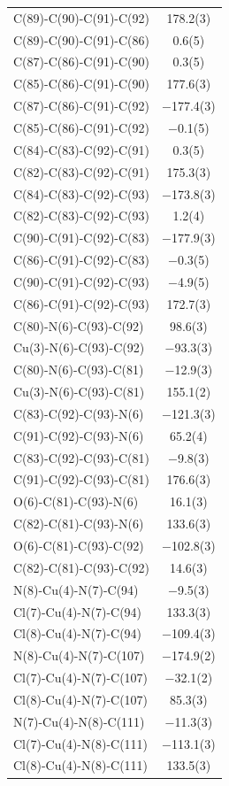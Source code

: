 \begin{center}
{\begin{supertabular}{p{1.8in}c}
C(89)-C(90)-C(91)-C(92)&178.2(3)\\
C(89)-C(90)-C(91)-C(86)&0.6(5)\\
C(87)-C(86)-C(91)-C(90)&0.3(5)\\
C(85)-C(86)-C(91)-C(90)&177.6(3)\\
C(87)-C(86)-C(91)-C(92)&$-$177.4(3)\\
C(85)-C(86)-C(91)-C(92)&$-$0.1(5)\\
C(84)-C(83)-C(92)-C(91)&0.3(5)\\
C(82)-C(83)-C(92)-C(91)&175.3(3)\\
C(84)-C(83)-C(92)-C(93)&$-$173.8(3)\\
C(82)-C(83)-C(92)-C(93)&1.2(4)\\
C(90)-C(91)-C(92)-C(83)&$-$177.9(3)\\
C(86)-C(91)-C(92)-C(83)&$-$0.3(5)\\
C(90)-C(91)-C(92)-C(93)&$-$4.9(5)\\
C(86)-C(91)-C(92)-C(93)&172.7(3)\\
C(80)-N(6)-C(93)-C(92)&98.6(3)\\
Cu(3)-N(6)-C(93)-C(92)&$-$93.3(3)\\
C(80)-N(6)-C(93)-C(81)&$-$12.9(3)\\
Cu(3)-N(6)-C(93)-C(81)&155.1(2)\\
C(83)-C(92)-C(93)-N(6)&$-$121.3(3)\\
C(91)-C(92)-C(93)-N(6)&65.2(4)\\
C(83)-C(92)-C(93)-C(81)&$-$9.8(3)\\
C(91)-C(92)-C(93)-C(81)&176.6(3)\\
O(6)-C(81)-C(93)-N(6)&16.1(3)\\
C(82)-C(81)-C(93)-N(6)&133.6(3)\\
O(6)-C(81)-C(93)-C(92)&$-$102.8(3)\\
C(82)-C(81)-C(93)-C(92)&14.6(3)\\
N(8)-Cu(4)-N(7)-C(94)&$-$9.5(3)\\
Cl(7)-Cu(4)-N(7)-C(94)&133.3(3)\\
Cl(8)-Cu(4)-N(7)-C(94)&$-$109.4(3)\\
N(8)-Cu(4)-N(7)-C(107)&$-$174.9(2)\\
Cl(7)-Cu(4)-N(7)-C(107)&$-$32.1(2)\\
Cl(8)-Cu(4)-N(7)-C(107)&85.3(3)\\
N(7)-Cu(4)-N(8)-C(111)&$-$11.3(3)\\
Cl(7)-Cu(4)-N(8)-C(111)&$-$113.1(3)\\
Cl(8)-Cu(4)-N(8)-C(111)&133.5(3)\\

\end{supertabular}}
\end{center}
